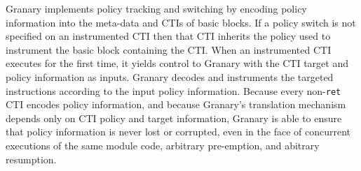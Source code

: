 \documentclass[preprint]{sigplanconf}
\begin{document}


Granary implements policy tracking and switching by encoding policy information into the meta-data and CTIs of basic blocks. If a policy switch is not specified on an instrumented CTI then that CTI inherits the policy used to instrument the basic block containing the CTI. When an instrumented CTI executes for the first time, it yields control to Granary with the CTI target and policy information as inputs. Granary decodes and instruments the targeted instructions according to the input policy information. Because every non-\texttt{ret} CTI encodes policy information, and because Granary's translation mechanism depends only on CTI policy and target information, Granary is able to ensure that policy information is never lost or corrupted, even in the face of concurrent executions of the same module code, arbitrary pre-emption, and abitrary resumption.


\end{document}
